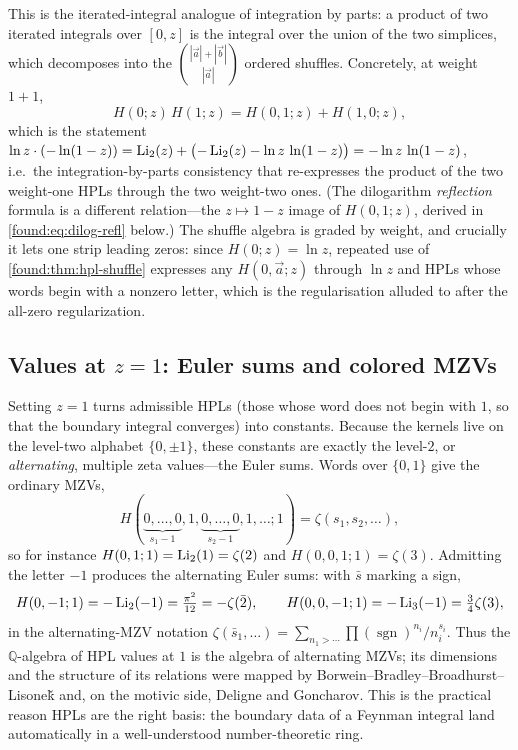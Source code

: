 This is the iterated-integral analogue of integration by parts: a product of two iterated integrals over $[0,z]$ is the integral over the union of the two simplices, which decomposes into the $\binom{|\vec a|+|\vec b|}{|\vec a|}$ ordered shuffles. Concretely, at weight $1+1$,
\begin{equation}\label{found:eq:hpl-shuffle-ex}
  H(0;z)\,H(1;z)=H(0,1;z)+H(1,0;z),
\end{equation}
which is the statement $\ln z\cdot(-\ln(1-z))=\operatorname{Li}_2(z)+\bigl(-\operatorname{Li}_2(z)-\ln z\,\ln(1-z)\bigr)=-\ln z\,\ln(1-z)$, i.e.\ the integration-by-parts consistency that re-expresses the product of the two weight-one HPLs through the two weight-two ones. (The dilogarithm \emph{reflection} formula is a different relation---the $z\mapsto1-z$ image of $H(0,1;z)$, derived in \eqref{found:eq:dilog-refl} below.) The shuffle algebra is graded by weight, and crucially it lets one strip leading zeros: since $H(0;z)=\ln z$, repeated use of \eqref{found:thm:hpl-shuffle} expresses any $H(0,\vec a;z)$ through $\ln z$ and HPLs whose words begin with a nonzero letter, which is the regularisation alluded to after the all-zero regularization.

\subsection{Values at \texorpdfstring{$z=1$}{z=1}: Euler sums and colored MZVs}

Setting $z=1$ turns admissible HPLs (those whose word does not begin with $1$, so that the boundary integral converges) into constants. Because the kernels live on the level-two alphabet $\{0,\pm1\}$, these constants are exactly the level-$2$, or \emph{alternating}, multiple zeta values---the Euler sums. Words over $\{0,1\}$ give the ordinary MZVs,
\begin{equation}\label{found:eq:hpl-mzv}
  H(\underbrace{0,\dots,0}_{s_1-1},1,\underbrace{0,\dots,0}_{s_2-1},1,\dots;1)=\zeta(s_1,s_2,\dots),
\end{equation}
so for instance $H(0,1;1)=\operatorname{Li}_2(1)=\zeta(2)$ and $H(0,0,1;1)=\zeta(3)$. Admitting the letter $-1$ produces the alternating Euler sums: with $\bar s$ marking a sign,
\[
  H(0,-1;1)=-\operatorname{Li}_2(-1)=\tfrac{\pi^2}{12}=-\zeta(\bar2),\qquad
  H(0,0,-1;1)=-\operatorname{Li}_3(-1)=\tfrac34\zeta(3),
\]
in the alternating-MZV notation $\zeta(\bar s_1,\dots)=\sum_{n_1>\cdots}\prod(\operatorname{sgn})^{n_i}/n_i^{s_i}$. Thus the $\mathbb{Q}$-algebra of HPL values at $1$ is the algebra of alternating MZVs; its dimensions and the structure of its relations were mapped by Borwein--Bradley--Broadhurst--Lisone\v{k} and, on the motivic side, Deligne and Goncharov. This is the practical reason HPLs are the right basis: the boundary data of a Feynman integral land automatically in a well-understood number-theoretic ring.

